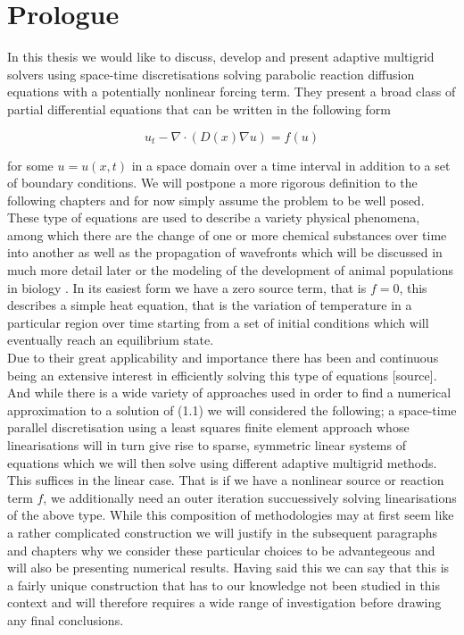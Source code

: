 \documentclass[../draft_1.tex]{subfiles}
\begin{document}
\chapter{Prologue}

In this thesis we would like to discuss, develop and present adaptive multigrid solvers using space-time discretisations solving parabolic reaction diffusion equations with a potentially nonlinear forcing term. They present a broad class of partial differential equations that can be written in the following form
\begin{ceqn}
\begin{equation}
u_t - \nabla \cdot ( D(x) \nabla u) = f(u)
\end{equation}
\end{ceqn}
for some $u = u(x,t)$ in a space domain over a time interval in addition to a set of boundary conditions. We will postpone a more rigorous definition to the following chapters and for now simply assume the problem to be well posed. These type of equations are used to describe a variety physical phenomena, among which there are the change of one or more chemical substances over time into another as well as the propagation of wavefronts which will be discussed in much more detail later \cite{zegeling2004adaptive} or the modeling of the development of animal populations in biology \cite{cosner2008reaction}. In its easiest form we have a zero source term, that is $f = 0$, this describes a simple heat equation, that is the variation of temperature in a particular region over time starting from a set of initial conditions which will eventually reach an equilibrium state.
\smallskip
\\
Due to their great applicability and importance there has been and continuous being an extensive interest in efficiently solving this type of equations [source]. And while there is a wide variety of approaches used in order to find a numerical approximation to a solution of (1.1) we will considered the following; a space-time parallel discretisation using a least squares finite element approach whose linearisations will in turn give rise to sparse, symmetric linear systems of equations which we will then solve using different adaptive multigrid methods. This suffices in the linear case. That is if we have a nonlinear source or reaction term $f$, we additionally need an outer iteration succuessively solving linearisations of the above type. While this composition of methodologies may at first seem like a rather complicated construction we will justify in the subsequent paragraphs and chapters why we consider these particular choices to be advantegeous and will also be presenting numerical results. Having said this we can say that this is a fairly unique construction that has to our knowledge not been studied in this context and will therefore requires a wide range of investigation before drawing any final conclusions.
\end{document}
